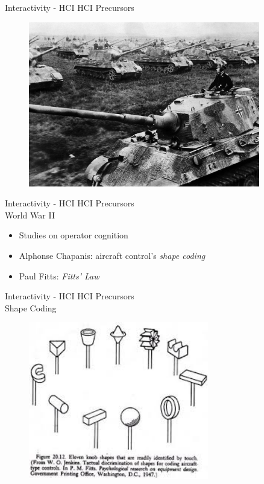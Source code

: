 \documentclass{beamer}
\begin{document}
\begin{frame}{Interactivity - HCI} 
    HCI Precursors
    \begin{figure}[h]
        \includegraphics[width=0.9\textwidth]{ww2.jpg}
    \end{figure}
\end{frame}

\begin{frame}{Interactivity - HCI} 
    HCI Precursors\\
    \vspace{5mm}
    World War II\\ 
    \begin{itemize}
        \item Studies on operator cognition
        \item Alphonse Chapanis: aircraft control's \textit{shape coding}
        \item Paul Fitts: \textit{Fitts' Law}
    \end{itemize}
\end{frame}

\begin{frame}{Interactivity - HCI} 
    HCI Precursors\\
    Shape Coding
    \begin{figure}[h]
        \includegraphics[width=0.7\textwidth]{shapecoding.jpeg}
    \end{figure}
\end{frame}
\end{document}
